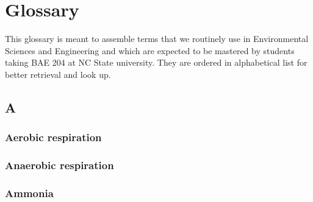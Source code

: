 \documentclass[]{book}
\theoremstyle{definition}
\theoremstyle{definition}
\theoremstyle{definition}
\theoremstyle{remark}
\begin{document}
\hypertarget{glossary}{\chapter{Glossary}\label{glossary}}

This glossary is meant to assemble terms that we routinely use in
Environmental Sciences and Engineering and which are expected to be
mastered by students taking BAE 204 at NC State university. They are
ordered in alphabetical list for better retrieval and look up.

\section{A}\label{a}

\subsection{Aerobic respiration}\label{aerobic-respiration}

\subsection{Anaerobic respiration}\label{anaerobic-respiration}

\subsection{Ammonia}\label{ammonia}
\end{document}
